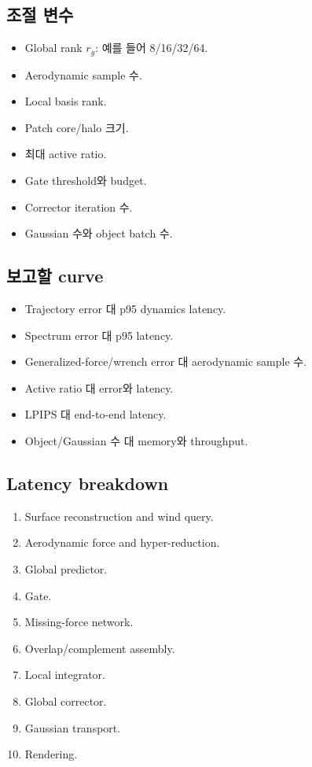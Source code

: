 \documentclass[11pt,a4paper]{article}
\begin{document}
\subsection*{조절 변수}

\begin{itemize}[leftmargin=1.5em]
  \item Global rank \(r_g\): 예를 들어 8/16/32/64.
  \item Aerodynamic sample 수.
  \item Local basis rank.
  \item Patch core/halo 크기.
  \item 최대 active ratio.
  \item Gate threshold와 budget.
  \item Corrector iteration 수.
  \item Gaussian 수와 object batch 수.
\end{itemize}

\subsection*{보고할 curve}

\begin{itemize}[leftmargin=1.5em]
  \item Trajectory error 대 p95 dynamics latency.
  \item Spectrum error 대 p95 latency.
  \item Generalized-force/wrench error 대 aerodynamic sample 수.
  \item Active ratio 대 error와 latency.
  \item LPIPS 대 end-to-end latency.
  \item Object/Gaussian 수 대 memory와 throughput.
\end{itemize}

\subsection*{Latency breakdown}

\begin{enumerate}[leftmargin=1.7em]
  \item Surface reconstruction and wind query.
  \item Aerodynamic force and hyper-reduction.
  \item Global predictor.
  \item Gate.
  \item Missing-force network.
  \item Overlap/complement assembly.
  \item Local integrator.
  \item Global corrector.
  \item Gaussian transport.
  \item Rendering.
\end{enumerate}
\end{document}
